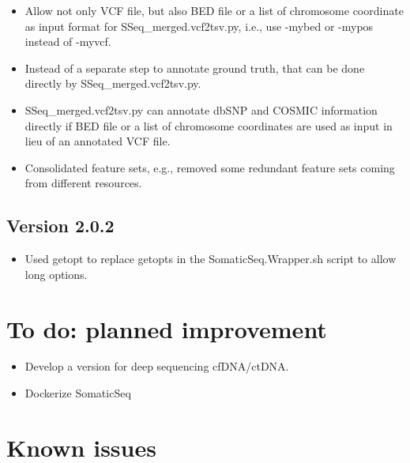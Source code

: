 \documentclass[10pt,letterpaper]{article}
\begin{document}
\begin{sloppypar}
\begin{itemize}
  \item
  Allow not only VCF file, but also BED file or a list of chromosome coordinate as input format for SSeq\_merged.vcf2tsv.py, i.e., use -mybed or -mypos instead of -myvcf. 

  \item
  Instead of a separate step to annotate ground truth, that can be done directly by SSeq\_merged.vcf2tsv.py.

  \item
  SSeq\_merged.vcf2tsv.py can annotate dbSNP and COSMIC information directly if BED file or a list of chromosome coordinates are used as input in lieu of an annotated VCF file. 

  \item
  Consolidated feature sets, e.g., removed some redundant feature sets coming from different resources.
\end{itemize}


\subsection{Version 2.0.2}

\begin{itemize}
  \item
  Used getopt to replace getopts in the SomaticSeq.Wrapper.sh script to allow long options. 
  
\end{itemize}




\section{To do: planned improvement}

\begin{itemize}

  \item
  Develop a version for deep sequencing cfDNA/ctDNA. 
  
  \item
  Dockerize SomaticSeq

\end{itemize}










\section{Known issues}


\end{sloppypar}
\end{document}
